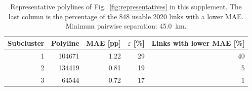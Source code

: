 \begin{table}[htbp]
\centering
\caption{Representative polylines of Fig.~\ref{fig:representatives} in this supplement. The last column is the percentage of the 848 usable 2020 links with a lower MAE. Minimum pairwise separation: 45.0~km.}
\label{tab:representatives}
\begin{tabular}{@{}rrrrr@{}}
\toprule
Subcluster & Polyline & MAE [pp] & $\varepsilon$ [\%] & Links with lower MAE [\%] \\
\midrule
1 & 104671 & 1.22 & 29 & 40 \\
2 & 134419 & 0.81 & 19 & 5 \\
3 & 64544 & 0.72 & 17 & 1 \\
\bottomrule
\end{tabular}
\end{table}
